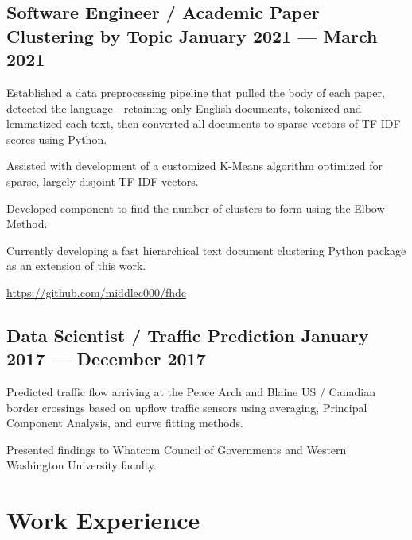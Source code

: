 \documentclass[letter,10pt]{article}
\begin{document}
\subsection{{Software Engineer / Academic Paper Clustering by Topic \hfill January 2021 --- March 2021}}
\begin{zitemize}
    \item Established a data preprocessing pipeline that pulled the body of each paper, detected the language - retaining only English documents, tokenized and lemmatized each text, then converted all documents to sparse vectors of TF-IDF scores using Python.
    \item Assisted with development of a customized K-Means algorithm optimized for sparse, largely disjoint TF-IDF vectors.
    \item Developed component to find the number of clusters to form using the Elbow Method.
    \item Currently developing a fast hierarchical text document clustering Python package as an extension of this work.
    \item \url{https://github.com/middlec000/fhdc}
\end{zitemize}

\subsection{{Data Scientist / Traffic Prediction \hfill January 2017 --- December 2017}}
\begin{zitemize}
    \item Predicted traffic flow arriving at the Peace Arch and Blaine US / Canadian border crossings based on upflow traffic sensors using averaging, Principal Component Analysis, and curve fitting methods.
    \item Presented findings to Whatcom Council of Governments and Western Washington University faculty.
\end{zitemize}

\section{Work Experience}
\end{document}
